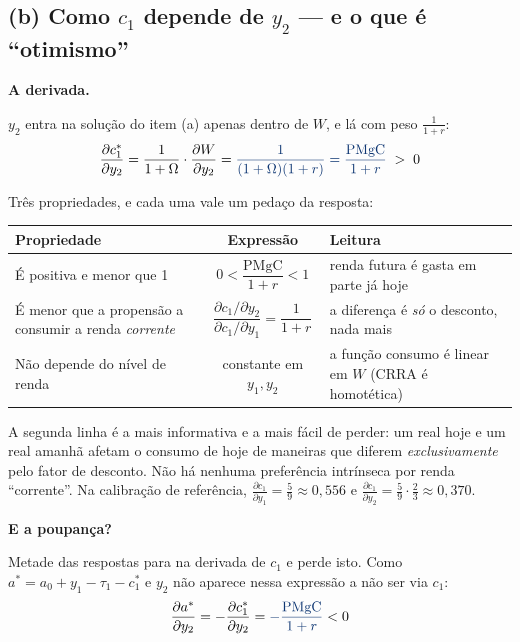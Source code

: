 \documentclass[11pt, a4paper]{article}
\newcommand{\passo}[1]{\medskip\noindent\textbf{#1}\par\nobreak}
\newcommand{\resp}[1]{%
  \ifmmode {\color{darkblue}#1}\else\textcolor{darkblue}{\textbf{#1}}\fi}
\newcommand{\stst}{^{\ast}}
\begin{document}
\subsection*{(b) Como $c_1$ depende de $y_2$ --- e o que é ``otimismo''}

\passo{A derivada.}
$y_2$ entra na solução do item (a) apenas dentro de $W$, e lá com peso $\frac{1}{1+r}$:
$$\frac{\partial c_1\stst}{\partial y_2}
=\frac{1}{1+\Omega}\cdot\frac{\partial W}{\partial y_2}
=\resp{\frac{1}{(1+\Omega)(1+r)}=\frac{\mathrm{PMgC}}{1+r}}\;>\;0$$

Três propriedades, e cada uma vale um pedaço da resposta:

\begin{center}
\small
\begin{tabular}{@{}lcl@{}}
\toprule
\textbf{Propriedade} & \textbf{Expressão} & \textbf{Leitura} \\
\midrule
É positiva e menor que 1
  & $0<\dfrac{\mathrm{PMgC}}{1+r}<1$
  & renda futura é gasta em parte já hoje \\[4pt]
É menor que a propensão a consumir a renda \emph{corrente}
  & $\dfrac{\partial c_1/\partial y_2}{\partial c_1/\partial y_1}=\dfrac{1}{1+r}$
  & a diferença é \emph{só} o desconto, nada mais \\[4pt]
Não depende do nível de renda
  & constante em $y_1,y_2$
  & a função consumo é linear em $W$ (CRRA é homotética) \\
\bottomrule
\end{tabular}
\end{center}

A segunda linha é a mais informativa e a mais fácil de perder: um real hoje e um real
amanhã afetam o consumo de hoje de maneiras que diferem \emph{exclusivamente} pelo fator de
desconto. Não há nenhuma preferência intrínseca por renda ``corrente''. Na calibração de
referência, $\frac{\partial c_1}{\partial y_1}=\frac{5}{9}\approx 0{,}556$ e
$\frac{\partial c_1}{\partial y_2}=\frac{5}{9}\cdot\frac{2}{3}\approx 0{,}370$.

\passo{E a poupança?} Metade das respostas para na derivada de $c_1$ e perde isto. Como
$a\stst=a_0+y_1-\tau_1-c_1\stst$ e $y_2$ não aparece nessa expressão a não ser via $c_1$:
$$\frac{\partial a\stst}{\partial y_2}=-\frac{\partial c_1\stst}{\partial y_2}
=\resp{-\frac{\mathrm{PMgC}}{1+r}}<0$$
\end{document}
